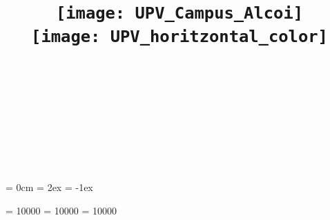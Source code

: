 
\usepackage[
	url = false,
	style = apa,
	hyperref = true,
	backref = true,
	]{biblatex}

\usepackage{csquotes}


\graphicspath{
    {./figuras/}
    {./logos/}
    }


\usepackage{xifthen}


\ifundef{\AlumnoB}{\newcommand{\AlumnoB}{}}{}
\ifundef{\AlumnoC}{\newcommand{\AlumnoC}{}}{}

\title{\Huge\bfseries%
	\vspace*{-1cm}
    \ifLogoAlcoi
	   \texttt{[image: UPV\_Campus\_Alcoi]}\\
    \else
        \texttt{[image: UPV\_horitzontal\_color]}\\
    \fi
    \vspace*{6cm}
    \titol
    \vspace*{3.5cm}
    ~
    }
    
\author{
    \AlumnoA\\[1ex]
    \AlumnoB\\[1ex]
	\AlumnoC\\[3.5cm]
  	\textbf{\Asignatura}\\[2ex]
  	\textbf{\CursoTitulacion}
    }
    
\date{\Data}


\parindent = 0cm
\parskip = 2ex
\partopsep = -1ex


\clubpenalty = 10000
\widowpenalty = 10000
\displaywidowpenalty = 10000


\usepackage{xspace}

\newcommand{\matlab}{{\textsc{Matlab}}\xspace}
\newcommand{\simulink}{\textit{Simulink}\xspace}


